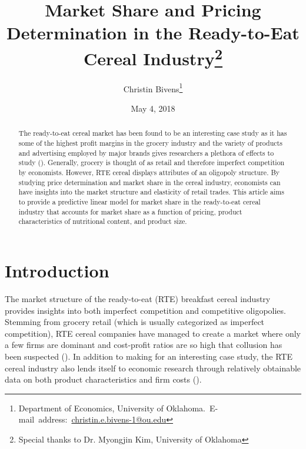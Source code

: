 \documentclass[12pt,english]{article}
\begin{document}
\begin{singlespace}
\title{Market Share and Pricing Determination in the Ready-to-Eat Cereal Industry\thanks{Special thanks to Dr. Myongjin Kim, University of Oklahoma}}
\end{singlespace}

\author{Christin Bivens\thanks{Department of Economics, University of Oklahoma.\
E-mail~address:~\href{mailto:christin.e.bivens-1@ou.edu}{christin.e.bivens-1@ou.edu}}}

\date{May 4, 2018}

\maketitle

\begin{abstract}
\begin{singlespace}
    The ready-to-eat cereal market has been found to be an interesting case study as it has some of the highest profit margins in the grocery industry and the variety of products and advertising employed by major brands gives researchers a plethora of effects to study (\cite{Nevo2001}). Generally, grocery is thought of as retail and therefore imperfect competition by economists. However, RTE cereal displays attributes of an oligopoly structure.  By studying price determination and market share in the cereal industry, economists can have insights into the market structure and elasticity of retail trades. This article aims to provide a predictive linear model for market share in the ready-to-eat cereal industry that accounts for market share as a function of pricing, product characteristics of nutritional content, and product size.
\end{singlespace}
\end{abstract}
    
\section{Introduction}
 
\tab The market structure of the ready-to-eat (RTE) breakfast cereal industry provides insights into both imperfect competition and competitive oligopolies. Stemming from grocery retail (which is usually categorized as imperfect competition), RTE cereal companies have managed to create a market where only a few firms are dominant and cost-profit ratios are so high that collusion has been suspected (\cite{Nevo2001}). In addition to making for an interesting case study, the RTE cereal industry also lends itself to economic research through relatively obtainable data on both product characteristics and firm costs ().
\end{document}
